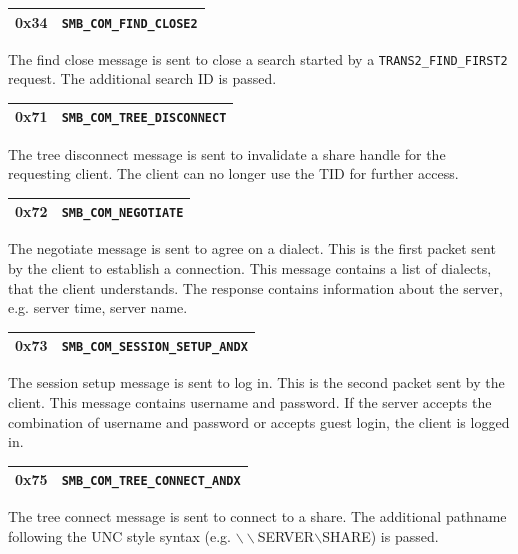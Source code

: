 \documentclass[11pt,a4paper]{book}
\begin{document}
\begin{center}
\renewcommand{\tabcolsep}{5mm}
\begin{tabular}{p{3cm}p{8cm}}
0x34 & \texttt{SMB\_COM\_FIND\_CLOSE2} \\
\hline
\end{tabular}
\end{center}
The find close message is sent to close a search started by a \texttt{TRANS2\_FIND\_FIRST2} request. The additional search ID is passed.

\begin{center}
\renewcommand{\tabcolsep}{5mm}
\begin{tabular}{p{3cm}p{8cm}}
0x71 & \texttt{SMB\_COM\_TREE\_DISCONNECT} \\
\hline
\end{tabular}
\end{center}
The tree disconnect message is sent to invalidate a share handle for the requesting client. The client can no longer use the TID for further access.

\begin{center}
\renewcommand{\tabcolsep}{5mm}
\begin{tabular}{p{3cm}p{8cm}}
0x72 & \texttt{SMB\_COM\_NEGOTIATE} \\
\hline
\end{tabular}
\end{center}
The negotiate message is sent to agree on a dialect. This is the first packet sent by the client to establish a connection. This message contains a list of dialects, that the client understands. The response contains information about the server, e.g. server time, server name.

\begin{center}
\renewcommand{\tabcolsep}{5mm}
\begin{tabular}{p{3cm}p{8cm}}
0x73 & \texttt{SMB\_COM\_SESSION\_SETUP\_ANDX} \\
\hline
\end{tabular}
\end{center}
The session setup message is sent to log in. This is the second packet sent by the client. This message contains username and password. If the server accepts the combination of username and password or accepts guest login, the client is logged in.

\begin{center}
\renewcommand{\tabcolsep}{5mm}
\begin{tabular}{p{3cm}p{8cm}}
0x75 & \texttt{SMB\_COM\_TREE\_CONNECT\_ANDX} \\
\hline
\end{tabular}
\end{center}
The tree connect message is sent to connect to a share. The additional pathname following the UNC style syntax (e.g. $\backslash\backslash$SERVER$\backslash$SHARE) is passed.
\end{document}
